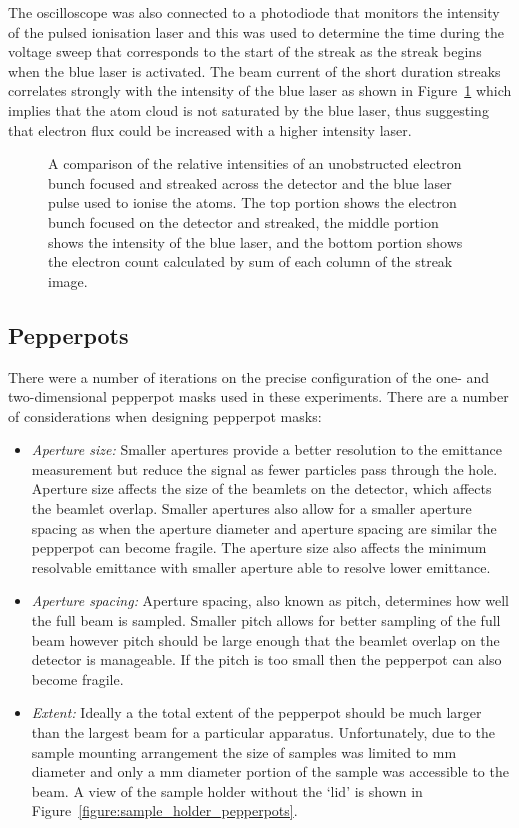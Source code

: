 The oscilloscope was also connected to a photodiode that monitors the intensity of the pulsed ionisation laser and this was used to determine the time during the voltage sweep that corresponds to the start of the streak as the streak begins when the blue laser is activated.
The beam current of the short duration streaks correlates strongly with the intensity of the blue laser as shown in Figure~\ref{figure:blue_streak} which implies that the atom cloud is not saturated by the blue laser, thus suggesting that electron flux could be increased with a higher intensity laser.

\begin{figure}
    \center
    
    \caption[Comparison between time-resolved electron count and ionisation laser power.]{A comparison of the relative intensities of an unobstructed electron bunch focused and streaked across the detector and the blue laser pulse used to ionise the atoms.
    The top portion shows the electron bunch focused on the detector and streaked, the middle portion shows the intensity of the blue laser, and the bottom portion shows the electron count calculated by sum of each column of the streak image.}
    \label{figure:blue_streak}
\end{figure}

\subsection{Pepperpots}
There were a number of iterations on the precise configuration of the one- and two-dimensional pepperpot masks used in these experiments.
There are a number of considerations when designing pepperpot masks:
\begin{itemize}
    \item{\emph{Aperture size:} Smaller apertures provide a better resolution to the emittance measurement but reduce the signal as fewer particles pass through the hole.
    Aperture size affects the size of the beamlets on the detector, which affects the beamlet overlap. Smaller apertures also allow for a smaller aperture spacing as when the aperture diameter and aperture spacing are similar the pepperpot can become fragile. The aperture size also affects the minimum resolvable emittance with smaller aperture able to resolve lower emittance.}
    \item{\emph{Aperture spacing:} Aperture spacing, also known as pitch, determines how well the full beam is sampled.
    Smaller pitch allows for better sampling of the full beam however pitch should be large enough that the beamlet overlap on the detector is manageable.
    If the pitch is too small then the pepperpot can also become fragile.}
    \item{\emph{Extent:} Ideally a the total extent of the pepperpot should be much larger than the largest beam for a particular apparatus.
    Unfortunately, due to the sample mounting arrangement the size of samples was limited to \unit[3]{mm} diameter and only a \unit[2]{mm} diameter portion of the sample was accessible to the beam. A view of the sample holder without the `lid' is shown in Figure~\ref{figure:sample_holder_pepperpots}.}
\end{itemize}

